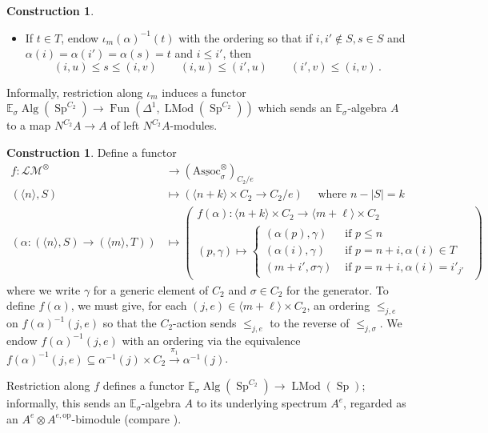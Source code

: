 \documentclass{article}
\DeclareMathOperator{\Alg}{Alg}
\DeclareMathOperator{\Fun}{Fun} %
\DeclareMathOperator{\LMod}{LMod} %
\DeclareMathOperator{\Spectra}{Sp} %
\newcommand{\EE}{\mathbb{E}}
\newcommand{\op}{\mathrm{op}}
\newcommand{\Assoc}{\mathrm{Assoc}}
\theoremstyle{definition}
\newtheorem{construction}[equation]{Construction}
\begin{document}
\begin{construction}
\begin{itemize}
        \item If $ t \in T $, endow $ \iota_m(\alpha)^{-1}(t) $ with the ordering so that if $ i, i' \notin S, s \in S $ and $ \alpha(i)=\alpha(i') = \alpha(s) = t $ and $ i \leq i' $, then
        \begin{equation*}
            (i,u) \leq s \leq (i, v) \qquad (i,u) \leq (i',u) \qquad (i',v) \leq (i,v) \,.
        \end{equation*}
    \end{itemize}
    Informally, restriction along $ \iota_m $ induces a functor $ \EE_\sigma\Alg\left(\Spectra^{C_2}\right) \to \Fun\left(\Delta^1, \LMod\left(\Spectra^{C_2}\right)\right) $ which sends an $ \EE_\sigma $-algebra $ A $ to a map $ N^{C_2} A \to A $ of left $ N^{C_2} A $-modules. 
\end{construction}
\begin{construction}
    Define a functor
    \begin{equation*}
    \begin{split}
        f \colon \mathcal{LM}^\otimes & \to \left(\underline{\Assoc}_\sigma^\otimes\right)_{C_2/e} \\
         \left(\langle n \rangle, S \right) & \mapsto \left(\langle n + k \rangle \times C_2 \to C_2/e \right) \quad \text{ where } n-|S|=k \\
         \left(\alpha \colon \left(\langle n \rangle, S\right) \to \left(\langle m \rangle, T\right) \right) & \mapsto \begin{pmatrix} f(\alpha) \colon \langle n+k \rangle \times C_2 \to \langle m + \ell \rangle \times C_2 \\
         (p,\gamma) \mapsto \begin{cases}
             (\alpha(p),\gamma) & \text{ if } p \leq n \\
             (\alpha (i),\gamma) & \text{ if } p = n+i, \alpha(i) \in T \\
             (m+i',\sigma\gamma) & \text{ if } p = n+i, \alpha(i) = i'_{j'}
         \end{cases}\end{pmatrix} 
    \end{split}
    \end{equation*} 
    where we write $ \gamma $ for a generic element of $ C_2 $ and $ \sigma \in C_2 $ for the generator. 
    To define $ f(\alpha) $, we must give, for each $ (j,e) \in \langle m + \ell \rangle \times C_2 $, an ordering $ \leq_{j,e} $ on $ f(\alpha)^{-1}(j,e) $ so that the $ C_2 $-action sends $ \leq_{j,e} $ to the reverse of $ \leq_{j,\sigma} $. 
    We endow $ f(\alpha)^{-1}(j,e) $ with an ordering via the equivalence $ f(\alpha)^{-1}(j,e) \subseteq \alpha^{-1}(j) \times C_2 \xrightarrow{\pi_1} \alpha^{-1}(j) $. 

    Restriction along $ f $ defines a functor $ \EE_\sigma\Alg\left(\Spectra^{C_2}\right) \to \LMod\left(\Spectra\right) $; informally, this sends an $ \EE_\sigma $-algebra $ A $ to its underlying spectrum $ A^e $, regarded as an $ A^e \otimes A^{e,\op} $-bimodule (compare \cite[Construction 4.6.3.7]{LurHA}). 
\end{construction}
\end{document}

